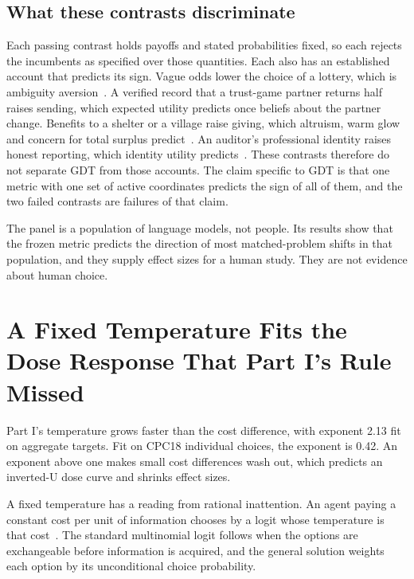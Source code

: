 \documentclass[journal]{IEEEtran}
\begin{document}
\subsection{What these contrasts discriminate}
Each passing contrast holds payoffs and stated probabilities fixed, so each rejects the incumbents as specified over those quantities.
Each also has an established account that predicts its sign.
Vague odds lower the choice of a lottery, which is ambiguity aversion~\cite{ellsberg1961}.
A verified record that a trust-game partner returns half raises sending, which expected utility predicts once beliefs about the partner change.
Benefits to a shelter or a village raise giving, which altruism, warm glow and concern for total surplus predict~\cite{andreoni1990,charness2002}.
An auditor's professional identity raises honest reporting, which identity utility predicts~\cite{akerlof2000}.
These contrasts therefore do not separate GDT from those accounts.
The claim specific to GDT is that one metric with one set of active coordinates predicts the sign of all of them, and the two failed contrasts are failures of that claim.

The panel is a population of language models, not people.
Its results show that the frozen metric predicts the direction of most matched-problem shifts in that population, and they supply effect sizes for a human study.
They are not evidence about human choice.

\section{A Fixed Temperature Fits the Dose Response That Part I's Rule Missed}
\label{sec:temperature}

Part I's temperature grows faster than the cost difference, with exponent 2.13 fit on aggregate targets.
Fit on CPC18 individual choices, the exponent is 0.42.
An exponent above one makes small cost differences wash out, which predicts an inverted-U dose curve and shrinks effect sizes.

A fixed temperature has a reading from rational inattention.
An agent paying a constant cost per unit of information chooses by a logit whose temperature is that cost~\cite{sims2003,matejka2015}.
The standard multinomial logit follows when the options are exchangeable before information is acquired, and the general solution weights each option by its unconditional choice probability.
\end{document}
